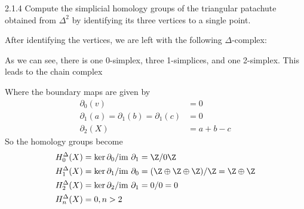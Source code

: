 \documentclass{article}
\newcommand{\im}{\text{im }}
\begin{document}
\begin{exercise}{2.1.4}{\parindent}
  Compute the simplicial homology groups of the triangular patachute
  obtained from $\Delta^2$ by identifying its three vertices to a
  single point.
\end{exercise}
\begin{solution}{\parindent}
  After identifying the vertices, we are left with the following
  $\Delta$-complex:
  \begin{center}
  \end{center}
  As we can see, there is one 0-simplex, three 1-simplices, and one
  2-simplex. This leads to the chain complex
  \begin{center}
  \end{center}
  Where the boundary maps are given by
  \begin{align*}
    \partial_0(v) &= 0 \\
    \partial_1(a) = \partial_1(b) = \partial_1(c) &= 0 \\
    \partial_2(X) &= a + b - c
  \end{align*}
  So the homology groups become
  \begin{align*}
    H_0^{\Delta}(X) &= \ker \partial_0/\im \partial_1 = \Z/0  \Z\\
    H_1^{\Delta}(X) &= \ker \partial_1/\im \partial_0 = (\Z \oplus \Z
    \oplus \Z)/\Z = \Z \oplus \Z \\
    H_2^{\Delta}(X) &= \ker \partial_2/\im \partial_1 = 0/0 = 0 \\
    H_n^{\Delta}(X) &= 0, n > 2
  \end{align*}
\end{solution}
\end{document}
